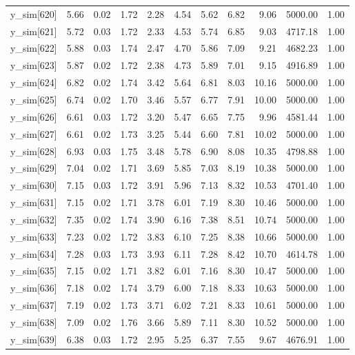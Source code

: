 \begin{table}[ht]
\begin{tabular}{rrrrrrrrrrr}
  y\_sim[620] & 5.66 & 0.02 & 1.72 & 2.28 & 4.54 & 5.62 & 6.82 & 9.06 & 5000.00 & 1.00 \\ 
  y\_sim[621] & 5.72 & 0.03 & 1.72 & 2.33 & 4.53 & 5.74 & 6.85 & 9.03 & 4717.18 & 1.00 \\ 
  y\_sim[622] & 5.88 & 0.03 & 1.74 & 2.47 & 4.70 & 5.86 & 7.09 & 9.21 & 4682.23 & 1.00 \\ 
  y\_sim[623] & 5.87 & 0.02 & 1.72 & 2.38 & 4.73 & 5.89 & 7.01 & 9.15 & 4916.89 & 1.00 \\ 
  y\_sim[624] & 6.82 & 0.02 & 1.74 & 3.42 & 5.64 & 6.81 & 8.03 & 10.16 & 5000.00 & 1.00 \\ 
  y\_sim[625] & 6.74 & 0.02 & 1.70 & 3.46 & 5.57 & 6.77 & 7.91 & 10.00 & 5000.00 & 1.00 \\ 
  y\_sim[626] & 6.61 & 0.03 & 1.72 & 3.20 & 5.47 & 6.65 & 7.75 & 9.96 & 4581.44 & 1.00 \\ 
  y\_sim[627] & 6.61 & 0.02 & 1.73 & 3.25 & 5.44 & 6.60 & 7.81 & 10.02 & 5000.00 & 1.00 \\ 
  y\_sim[628] & 6.93 & 0.03 & 1.75 & 3.48 & 5.78 & 6.90 & 8.08 & 10.35 & 4798.88 & 1.00 \\ 
  y\_sim[629] & 7.04 & 0.02 & 1.71 & 3.69 & 5.85 & 7.03 & 8.19 & 10.38 & 5000.00 & 1.00 \\ 
  y\_sim[630] & 7.15 & 0.03 & 1.72 & 3.91 & 5.96 & 7.13 & 8.32 & 10.53 & 4701.40 & 1.00 \\ 
  y\_sim[631] & 7.15 & 0.02 & 1.71 & 3.78 & 6.01 & 7.19 & 8.30 & 10.46 & 5000.00 & 1.00 \\ 
  y\_sim[632] & 7.35 & 0.02 & 1.74 & 3.90 & 6.16 & 7.38 & 8.51 & 10.74 & 5000.00 & 1.00 \\ 
  y\_sim[633] & 7.23 & 0.02 & 1.72 & 3.83 & 6.10 & 7.25 & 8.38 & 10.66 & 5000.00 & 1.00 \\ 
  y\_sim[634] & 7.28 & 0.03 & 1.73 & 3.93 & 6.11 & 7.28 & 8.42 & 10.70 & 4614.78 & 1.00 \\ 
  y\_sim[635] & 7.15 & 0.02 & 1.71 & 3.82 & 6.01 & 7.16 & 8.30 & 10.47 & 5000.00 & 1.00 \\ 
  y\_sim[636] & 7.18 & 0.02 & 1.74 & 3.79 & 6.00 & 7.18 & 8.33 & 10.63 & 5000.00 & 1.00 \\ 
  y\_sim[637] & 7.19 & 0.02 & 1.73 & 3.71 & 6.02 & 7.21 & 8.33 & 10.61 & 5000.00 & 1.00 \\ 
  y\_sim[638] & 7.09 & 0.02 & 1.76 & 3.66 & 5.89 & 7.11 & 8.30 & 10.52 & 5000.00 & 1.00 \\ 
  y\_sim[639] & 6.38 & 0.03 & 1.72 & 2.95 & 5.25 & 6.37 & 7.55 & 9.67 & 4676.91 & 1.00 \\ 

\end{tabular}
\end{table}
